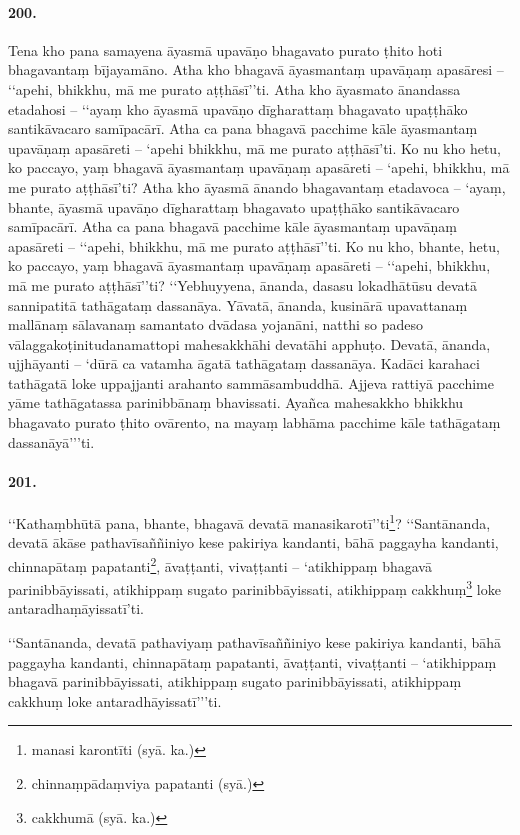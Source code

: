 \paragraph{200.} Tena kho pana samayena āyasmā upavāṇo bhagavato purato ṭhito hoti bhagavantaṃ bījayamāno. Atha kho bhagavā āyasmantaṃ upavāṇaṃ apasāresi – ‘‘apehi, bhikkhu, mā me purato aṭṭhāsī’’ti. Atha kho āyasmato ānandassa etadahosi – ‘‘ayaṃ kho āyasmā upavāṇo dīgharattaṃ bhagavato upaṭṭhāko santikāvacaro samīpacārī. Atha ca pana bhagavā pacchime kāle āyasmantaṃ upavāṇaṃ apasāreti – ‘apehi bhikkhu, mā me purato aṭṭhāsī’ti. Ko nu kho hetu, ko paccayo, yaṃ bhagavā āyasmantaṃ upavāṇaṃ apasāreti – ‘apehi, bhikkhu, mā me purato aṭṭhāsī’ti? Atha kho āyasmā ānando bhagavantaṃ etadavoca – ‘ayaṃ, bhante, āyasmā upavāṇo dīgharattaṃ bhagavato upaṭṭhāko santikāvacaro samīpacārī. Atha ca pana bhagavā pacchime kāle āyasmantaṃ upavāṇaṃ apasāreti – ‘‘apehi, bhikkhu, mā me purato aṭṭhāsī’’ti. Ko nu kho, bhante, hetu, ko paccayo, yaṃ bhagavā āyasmantaṃ upavāṇaṃ apasāreti – ‘‘apehi, bhikkhu, mā me purato aṭṭhāsī’’ti? ‘‘Yebhuyyena, ānanda, dasasu lokadhātūsu devatā sannipatitā tathāgataṃ dassanāya. Yāvatā, ānanda, kusinārā upavattanaṃ mallānaṃ sālavanaṃ samantato dvādasa yojanāni, natthi so padeso vālaggakoṭinitudanamattopi mahesakkhāhi devatāhi apphuṭo. Devatā, ānanda, ujjhāyanti – ‘dūrā ca vatamha āgatā tathāgataṃ dassanāya. Kadāci karahaci tathāgatā loke uppajjanti arahanto sammāsambuddhā. Ajjeva rattiyā pacchime yāme tathāgatassa parinibbānaṃ bhavissati. Ayañca mahesakkho bhikkhu bhagavato purato ṭhito ovārento, na mayaṃ labhāma pacchime kāle tathāgataṃ dassanāyā’’’ti.

\paragraph{201.} ‘‘Kathaṃbhūtā pana, bhante, bhagavā devatā manasikarotī’’ti\footnote{manasi karontīti (syā. ka.)}? ‘‘Santānanda, devatā ākāse pathavīsaññiniyo kese pakiriya kandanti, bāhā paggayha kandanti, chinnapātaṃ papatanti\footnote{chinnaṃpādaṃviya papatanti (syā.)}, āvaṭṭanti, vivaṭṭanti – ‘atikhippaṃ bhagavā parinibbāyissati, atikhippaṃ sugato parinibbāyissati, atikhippaṃ cakkhuṃ\footnote{cakkhumā (syā. ka.)} loke antaradhaṃāyissatī’ti.

‘‘Santānanda, devatā pathaviyaṃ pathavīsaññiniyo kese pakiriya kandanti, bāhā paggayha kandanti, chinnapātaṃ papatanti, āvaṭṭanti, vivaṭṭanti – ‘atikhippaṃ bhagavā parinibbāyissati, atikhippaṃ sugato parinibbāyissati, atikhippaṃ cakkhuṃ loke antaradhāyissatī’’’ti.

